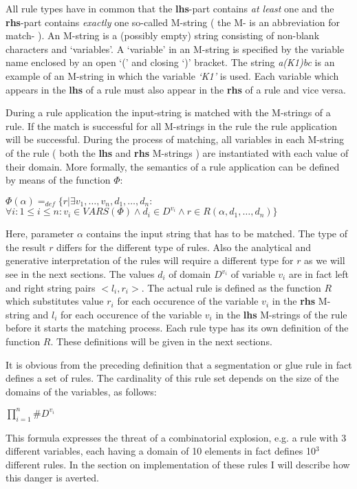All rule types have in
common that the {\bf lhs}-part contains {\em at least} one and the {\bf rhs}-part contains
{\em exactly } one so-called M-string ( the M- is an abbreviation for match- ).
An M-string is a (possibly empty) string consisting of non-blank characters and `variables'.
A `variable' in an M-string is specified by the variable name enclosed by an
open `(' and closing `)' bracket. The string {\em a(K1)bc } is an example of
an M-string in which the variable {\em `K1'} is used.
Each variable
which appears in the {\bf lhs} of a rule must also appear in the {\bf rhs} of a rule
and vice versa.

During a rule application the input-string
is matched with the M-strings of a rule. If the match is successful
for all M-strings in the rule the rule application will be successful.
During the process of matching, all variables in each M-string of the rule
( both the {\bf lhs} and {\bf rhs} M-strings ) are instantiated with each value of
their domain. More formally, the semantics of a rule application can be defined
by means of the function $\Phi$:
\small
\begin{code}
$\Phi(\alpha) =_{def} \{ r | \exists v_{1}, \ldots, v_{n}, d_{1}, \ldots, d_{n}:$\\
\>\>\>$\forall i: 1 \leq i \leq n: v_{i} \in VARS(\Phi) \wedge d_{i}\in D^{v_{i}} \wedge r \in R(\alpha,d_{1}, \ldots ,d_{n}) \}$\\
\end{code}
\normalsize
Here, parameter $\alpha$ contains the input string that has to be matched. The
type of the result $r$ differs for the different
type of rules. Also the analytical and generative interpretation of the rules
will require a different type for $r$ as we will see in the next
sections. The values $d_{i}$ of domain $D^{v_{i}}$ of variable $v_{i}$ are in
fact left and right
string pairs $<l_{i}, r_{i}>$. The actual rule is defined as the function $R$
which substitutes value $r_{i}$ for
each occurence of the variable $v_{i}$ in the {\bf rhs} M-string and $l_{i}$ for
each occurence of the variable $v_{i}$ in the {\bf lhs} M-strings of the rule
before it starts the matching process. Each rule type has its own
definition of the function $R$. These definitions will be given
in the next sections.

It is obvious from the preceding definition
that a segmentation or glue rule in fact defines a set of rules.
The cardinality of this rule set depends on the size of the domains of the
variables, as follows:
\small
\begin{code}
\>$\prod_{i=1}^{n} \#D^{v_{i}}$\\
\end{code}
\normalsize
This formula expresses the threat of a combinatorial
explosion, e.g. a rule with 3 different variables, each having a domain
of 10 elements in fact defines 10$^{3}$ different rules.
In the section on implementation of these rules I will describe how this danger
is averted.
